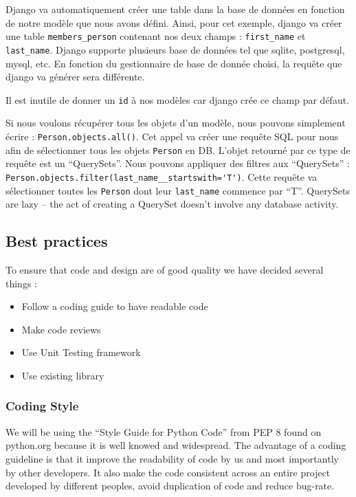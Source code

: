 \documentclass[11pt, a4paper]{article}   	%
\begin{document}
Django va automatiquement créer une table dans la base de données en fonction de notre modèle que nous avons défini.
Ainsi, pour cet exemple, django va créer une table \texttt{members\_person} contenant nos deux champs : \texttt{first\_name} et \texttt{last\_name}.
Django supporte plusieurs base de données tel que sqlite, postgresql, mysql, etc.
En fonction du gestionnaire de base de donnée choisi, la requête que django va générer sera différente. 

Il est inutile de donner un \texttt{id} à nos modèles car django crée ce champ par défaut.

Si nous voulons récupérer tous les objets d'un modèle, nous pouvons simplement écrire : \lstinline{Person.objects.all()}.
Cet appel va créer une requête SQL pour nous afin de sélectionner tous les objets \texttt{Person} en DB.
L'objet retourné par ce type de requête est un \enquote{QuerySets}.
Nous pouvons appliquer des filtres aux \enquote{QuerySets} : \lstinline{Person.objects.filter(last_name__startswith='T')}.
Cette requête va sélectionner toutes les \texttt{Person} dont leur \texttt{last\_name} commence par \enquote{T}.
QuerySets are lazy – the act of creating a QuerySet doesn’t involve any database activity.





\subsection{Best practices}

To ensure that code and design are of good quality we have decided several things :


\begin{itemize}
\item Follow a coding guide to have readable code
\item Make code reviews
\item Use Unit Testing framework
\item Use existing library
\end{itemize} 

\subsubsection{Coding Style}
	
We will be using the \enquote{Style Guide for Python Code} from PEP 8 found on python.org because it is well knowed and widespread. 
The advantage of a coding guideline is that it improve the readability of code by us and most importantly by other developers. 
It also make the code consistent across an entire project developed by different peoples, avoid duplication of code and reduce bug-rate. 
 
\end{document}
